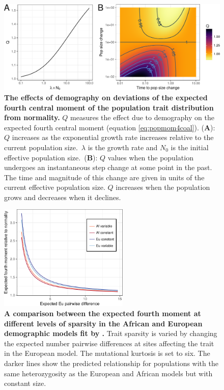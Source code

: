 \begin{figure}
\centering
\includegraphics[width=\textwidth]{./figures/combo_q.pdf}
\caption{
\textbf{The effects of demography on deviations of the expected
fourth central moment of the population trait distribution from normality.} $Q$
measures the effect due to demography on the expected fourth central moment
(equation \eqref{eq:popmom4coal}). (\textbf{A}): $Q$ increases as the
exponential growth rate increases relative to the current population
size.~$\lambda$ is the growth rate and $N_0$ is the initial effective population
size.~(\textbf{B}): $Q$ values when the population undergoes an instantaneous
step change at some point in the past. The time and magnitude of this change are
given in units of the current effective population size. $Q$ increases when the
population grows and decreases when it declines.}
\label{fig:Qexp}
\end{figure}

\begin{figure}
\centering
\includegraphics[width=0.55\textwidth]{./figures/af_eu_mom4_r.pdf}
\caption{ \textbf{A comparison between the expected fourth moment at different levels of
sparsity in the African and European demographic models fit
by \citet{Tennessen2012}.} Trait sparsity is varied by changing the expected
number pairwise differences at sites affecting the trait in the European model.
The mutational kurtosis is set to six. The darker lines show the predicted
relationship for populations with the same heterozygosity as the European and
African models but with constant size.}
\label{fig:afeucomp}
\end{figure}

